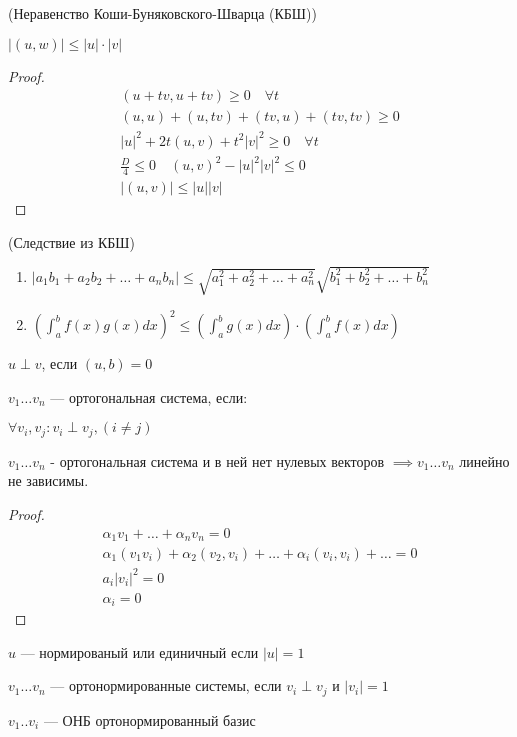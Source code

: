 \begin{theorem}(Неравенство Коши-Буняковского-Шварца (КБШ))

    $|(u, w)| \leq |u| \cdot |v|$

\end{theorem}

\begin{proof}
    \begin{gather*}
        (u + t v, u+t v) \ge 0 \quad \forall t\\
        (u, u) + (u,t v)+(t v, u) + (t v, t v) \ge 0\\
        |u|^2 + 2t(u,v) + t^2 |v|^2 \ge 0 \quad \forall t\\
        \frac{D}{4} \le 0 \quad (u,v)^2 - |u|^2 |v|^2 \le 0\\
        |(u,v)| \le |u| |v|
    \end{gather*}
\end{proof}

\begin{corollary} (Следствие из КБШ)
    \begin{enumerate}
        
        \item $|a_1 b_1 + a_2 b_2 + \ldots + a_n b_n| \leq \sqrt{a_1^2 + a_2^2 + \ldots + a_n^2} \sqrt{b_1^2 + b_2^2 + \ldots + b_n^2}$
        
        \item $(\int_a^b f(x)g(x)dx)^2 \leq (\int_a^b g(x)dx) \cdot (\int_a^b f(x)dx)$
    \end{enumerate}
\end{corollary}


\begin{definition}
    $u \perp v$, если $(u, b) = 0$
\end{definition}

\begin{definition}
    $v_1 \ldots v_n$ --- ортогональная система, если: 

    $\forall v_i, v_j: v_i \perp v_j, (i \neq j)$    
\end{definition}


 \begin{theorem}
    $v_1 \ldots v_n$ - ортогональная система и в ней нет нулевых векторов $\implies v_1 \ldots v_n$ линейно не зависимы.
 \end{theorem}

 \begin{proof}
    \begin{gather*}
        \alpha_1 v_1 + \ldots + \alpha_n v_n = 0 \\
        \alpha_1 (v_1 v_i) + \alpha_2 (v_2, v_i) + \ldots + \alpha_i (v_i, v_i) + \ldots = 0 \\
        a_i |v_i|^2 = 0\\
        \alpha_i = 0
    \end{gather*}
 \end{proof}

 \begin{definition}
    $u$ --- нормированый или единичный если $|u| = 1$

    $v_1 \ldots v_n$ --- ортонормированные системы, если $v_i \perp v_j$ и $|v_i| = 1$

    $v_1 .. v_i$ --- ОНБ ортонормированный базис
 \end{definition}